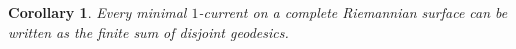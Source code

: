 \documentclass[reqno,12pt,letterpaper]{amsart}
\newcommand{\NN}{\mathbf{N}}
\newcommand{\RR}{\mathbf{R}}
\newcommand{\Hyp}{\mathbf H}
\newtheorem{corollary}[theorem]{Corollary}
\theoremstyle{definition}
\newtheorem{example}[theorem]{Example}
\numberwithin{equation}{section}
\begin{document}
\begin{corollary}\label{main crly 2}
Every minimal $1$-current on a complete Riemannian surface can be written as the finite sum of disjoint geodesics.
\end{corollary}
%
%
%
%
\end{document}
